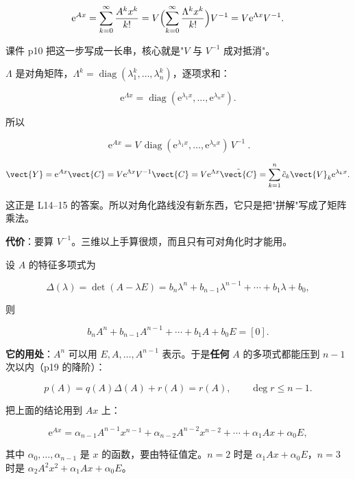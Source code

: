 \documentclass[11pt]{ctexart}
\newcommand{\diag}{\operatorname{diag}}
\begin{document}
\[
\mathrm{e}^{Ax}=\sum_{k=0}^{\infty}\frac{A^kx^k}{k!}
=V\Bigl(\sum_{k=0}^{\infty}\frac{\Lambda^kx^k}{k!}\Bigr)V^{-1}
=V\mathrm{e}^{\Lambda x}V^{-1}.
\]

课件 p10 把这一步写成一长串，核心就是"$V$ 与 $V^{-1}$ 成对抵消"。


$\Lambda$ 是对角矩阵，$\Lambda^k=\diag(\lambda_1^k,\dots,\lambda_n^k)$，逐项求和：

\[
\mathrm{e}^{\Lambda x}=\diag(\mathrm{e}^{\lambda_1x},\dots,\mathrm{e}^{\lambda_nx}).
\]

所以

\[
\boxed{\ \mathrm{e}^{Ax}=V\,\diag(\mathrm{e}^{\lambda_1x},\dots,\mathrm{e}^{\lambda_nx})\,V^{-1}\ }.
\]


\[
\vect{Y}=\mathrm{e}^{Ax}\vect{C}=V\mathrm{e}^{\Lambda x}V^{-1}\vect{C}
=V\mathrm{e}^{\Lambda x}\tilde{\vect{C}}
=\sum_{k=1}^{n}\tilde c_k\vect{V}_k\mathrm{e}^{\lambda_kx}.
\]

这正是 L14--15 的答案。所以对角化路线没有新东西，它只是把"拼解"写成了矩阵乘法。

\textbf{代价}：要算 $V^{-1}$。三维以上手算很烦，而且只有可对角化时才能用。



设 $A$ 的特征多项式为

\[
\Delta(\lambda)=\det(A-\lambda E)=b_n\lambda^n+b_{n-1}\lambda^{n-1}+\cdots+b_1\lambda+b_0,
\]

则

\[
b_nA^n+b_{n-1}A^{n-1}+\cdots+b_1A+b_0E=[0].
\]

\textbf{它的用处}：$A^n$ 可以用 $E,A,\dots,A^{n-1}$ 表示。于是\textbf{任何} $A$ 的多项式都能压到 $n-1$ 次以内（p19 的降阶）：

\[
p(A)=q(A)\Delta(A)+r(A)=r(A),\qquad \deg r\le n-1 .
\]


把上面的结论用到 $Ax$ 上：

\[
\mathrm{e}^{Ax}=\alpha_{n-1}A^{n-1}x^{n-1}+\alpha_{n-2}A^{n-2}x^{n-2}+\cdots+\alpha_1Ax+\alpha_0E,
\]

其中 $\alpha_0,\dots,\alpha_{n-1}$ 是 $x$ 的函数，要由特征值定。$n=2$ 时是 $\alpha_1Ax+\alpha_0E$，$n=3$ 时是 $\alpha_2A^2x^2+\alpha_1Ax+\alpha_0E$。
\end{document}
